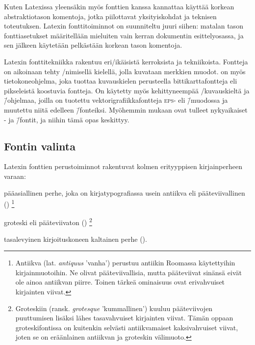 Kuten Latexissa yleensäkin myös fonttien kanssa kannattaa käyttää
korkean abstraktiotason komentoja, jotka piilottavat yksityiskohdat ja
teknisen toteutuksen. Latexin fonttitoiminnot on suunniteltu juuri
siihen: matalan tason font\-ti\-ase\-tuk\-set määritellään mieluiten
vain kerran dokumentin esittelyosassa, ja sen jälkeen käytetään
pelkästään korkean tason komentoja.

Latexin fonttitekniikka rakentuu eri\-/ikäisistä kerroksista ja
tekniikoista. Fontteja on aikoinaan tehty
\-/nimisellä kielellä, jolla
kuvataan merkkien muodot.  on myös tietokoneohjelma,
joka tuottaa kuvauskielen perusteella bittikarttafontteja eli
pikseleistä koostuvia fontteja. On käytetty myös kehittyneempää
\-/kuvauskieltä ja \=/ohjelmaa,
joilla on tuotettu vek\-tori\-gra\-fiik\-ka\-font\-te\-ja \textsc{eps}-
eli  \=/muodossa ja muutettu niitä
edelleen  \=/fonteiksi. Myöhemmin mukaan
ovat tulleet nyky\-aikai\-set - ja  \=/fontit, ja niihin tämä opas keskittyy.

\subsection{Fontin valinta}

Latexin fonttien perus\-toiminnot rakentuvat kolmen erityyppisen
kirjainperheen varaan:

\begin{nluetelma}

\item pääasiallinen perhe, joka on kirja\-typo\-gra\-fias\-sa usein
  antiikva eli pääteviivallinen ()%
  \footnote{Antiikva (lat. \emph{antiquus} 'vanha') perustuu antiikin
    Roomassa käytettyihin kirjainmuotoihin. Ne olivat pääteviivallisia,
    mutta pääteviivat sinänsä eivät ole ainoa antiikvan piirre. Toinen
    tärkeä ominaisuus ovat erivahvuiset kirjainten viivat.}

\item groteski eli pääteviivaton ()%
  \footnote{Groteskiin (ransk. \emph{grotesque} 'kummallinen') kuuluu
    pääteviivojen puuttumisen lisäksi lähes tasavahvuiset kirjainten
    viivat. Tämän oppaan groteskifontissa on kuitenkin selvästi
    antiikvamaiset kaksivahvuiset viivat, joten se on eräänlainen
    antiikvan ja groteskin välimuoto.}

\item tasalevyinen kirjoituskoneen kaltainen perhe
  ().

\end{nluetelma}

